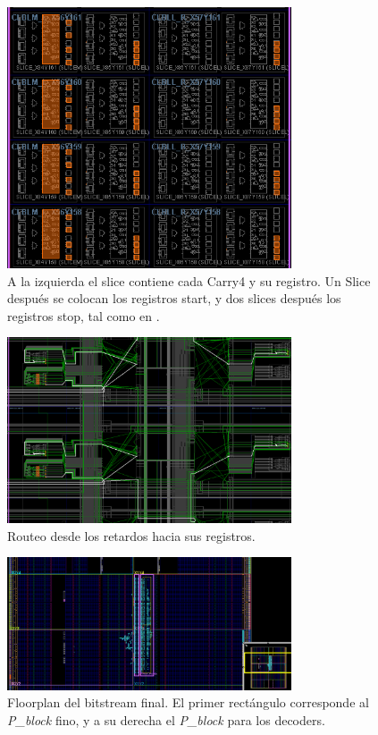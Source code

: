  \begin{figure}[H]
      \centering
      \includegraphics[width=0.75\textwidth]{imagenes/floorplan_carrys.png}
      \caption{A la izquierda el slice contiene cada Carry4 y su registro. Un Slice después se colocan
      los registros start, y dos slices después los registros stop, tal como en \cite{machado_novel_2018}.}
      \label{fig: floorplan_retardos}
 \end{figure}%
 \begin{figure}[H]
      \centering
      \includegraphics[width=0.75\textwidth]{imagenes/floorplan_routeo.png}
      \caption{Routeo desde los retardos hacia sus registros.}
      \label{fig: routeo}
 \end{figure}%
 \begin{figure}[H]
      \centering
      \includegraphics[width=0.75\textwidth]{imagenes/floorplan_pblocks.png}
      \caption{Floorplan del bitstream final. El primer rectángulo corresponde al \textit{P\_block} fino,
      y a su derecha el \textit{P\_block} para los decoders.}
      \label{fig: floorplan_pblocks}
 \end{figure}

